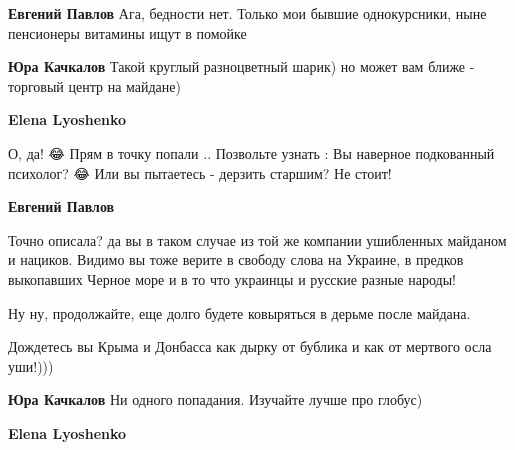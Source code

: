 \begin{itemize}
\begin{itemize}
\textbf{Евгений Павлов}
Ага, бедности нет. Только мои бывшие однокурсники, ныне пенсионеры витамины ищут в помойке

 

\textbf{Юра Качкалов}
Такой круглый разноцветный шарик)
но может вам ближе - торговый центр на майдане)

 
\textbf{Elena Lyoshenko}

О, да! 😂 Прям в точку попали .. Позвольте узнать : Вы наверное подкованный
психолог? 😂 Или вы пытаетесь - дерзить старшим? Не стоит!

 
\textbf{Евгений Павлов} 

Точно описала? да вы в таком случае из той же компании ушибленных майданом и
нациков. Видимо вы тоже верите в свободу слова на Украине, в предков выкопавших
Черное море и в то что украинцы и русские разные народы! 

Ну ну, продолжайте, еще долго будете ковыряться в дерьме после майдана. 

Дождетесь вы Крыма и Донбасса как дырку от бублика и как от мертвого осла
уши!)))

 

\textbf{Юра Качкалов}
Ни одного попадания.
Изучайте лучше про глобус)

 
\textbf{Elena Lyoshenko}


\end{itemize}
\end{itemize}
